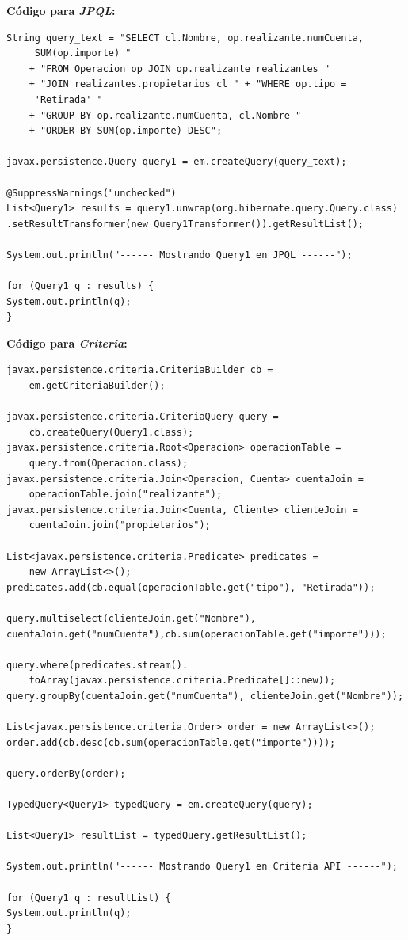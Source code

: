\documentclass[11pt,a4paper]{article}
\begin{document}
\textbf{Código para \textit{JPQL}:}
\begin{lstlisting}
String query_text = "SELECT cl.Nombre, op.realizante.numCuenta,
	 SUM(op.importe) "
	+ "FROM Operacion op JOIN op.realizante realizantes "
	+ "JOIN realizantes.propietarios cl " + "WHERE op.tipo =
	 'Retirada' "
	+ "GROUP BY op.realizante.numCuenta, cl.Nombre " 
	+ "ORDER BY SUM(op.importe) DESC";

javax.persistence.Query query1 = em.createQuery(query_text);

@SuppressWarnings("unchecked")
List<Query1> results = query1.unwrap(org.hibernate.query.Query.class)
.setResultTransformer(new Query1Transformer()).getResultList();

System.out.println("------ Mostrando Query1 en JPQL ------");

for (Query1 q : results) {
System.out.println(q);
}
\end{lstlisting}
\newpage
\textbf{Código para \textit{Criteria}:}
\begin{lstlisting}
javax.persistence.criteria.CriteriaBuilder cb = 
	em.getCriteriaBuilder();

javax.persistence.criteria.CriteriaQuery query = 
	cb.createQuery(Query1.class);
javax.persistence.criteria.Root<Operacion> operacionTable = 
	query.from(Operacion.class);
javax.persistence.criteria.Join<Operacion, Cuenta> cuentaJoin = 
	operacionTable.join("realizante");
javax.persistence.criteria.Join<Cuenta, Cliente> clienteJoin = 
	cuentaJoin.join("propietarios");

List<javax.persistence.criteria.Predicate> predicates = 
	new ArrayList<>();
predicates.add(cb.equal(operacionTable.get("tipo"), "Retirada"));

query.multiselect(clienteJoin.get("Nombre"), 
cuentaJoin.get("numCuenta"),cb.sum(operacionTable.get("importe")));

query.where(predicates.stream().
	toArray(javax.persistence.criteria.Predicate[]::new));
query.groupBy(cuentaJoin.get("numCuenta"), clienteJoin.get("Nombre"));

List<javax.persistence.criteria.Order> order = new ArrayList<>();
order.add(cb.desc(cb.sum(operacionTable.get("importe"))));

query.orderBy(order);

TypedQuery<Query1> typedQuery = em.createQuery(query);

List<Query1> resultList = typedQuery.getResultList();

System.out.println("------ Mostrando Query1 en Criteria API ------");

for (Query1 q : resultList) {
System.out.println(q);
}

\end{lstlisting}
\end{document}
